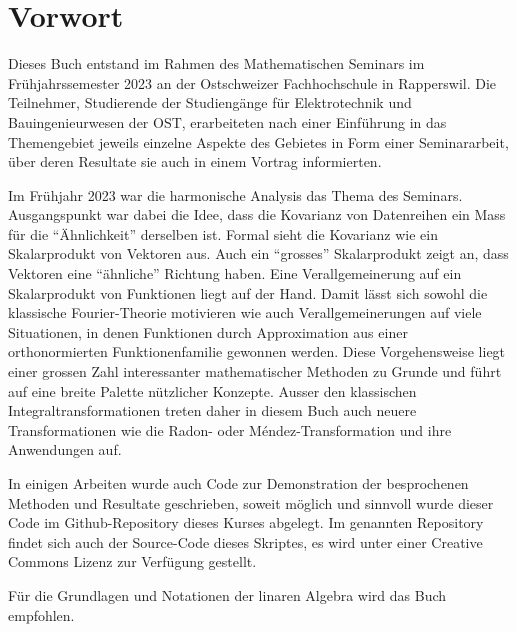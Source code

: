 %
%
%
\chapter*{Vorwort}

Dieses Buch entstand im Rahmen des Mathematischen Seminars
im Frühjahrssemester 2023 an der Ostschweizer Fachhochschule in Rapperswil.
Die Teilnehmer, Studierende der Studiengänge für Elektrotechnik
und Bauingenieurwesen
der OST, erarbeiteten nach einer Einführung in das Themengebiet jeweils
einzelne Aspekte des Gebietes in Form einer Seminararbeit, über
deren Resultate sie auch in einem Vortrag informierten. 

Im Frühjahr 2023 war die harmonische Analysis das Thema des Seminars.
Ausgangspunkt war dabei die Idee, dass die Kovarianz von Datenreihen
ein Mass für die ``Ähnlichkeit'' derselben ist.
Formal sieht die Kovarianz wie ein Skalarprodukt von Vektoren aus.
Auch ein ``grosses'' Skalarprodukt zeigt an, dass Vektoren eine
``ähnliche'' Richtung haben.
Eine Verallgemeinerung auf ein Skalarprodukt von Funktionen liegt auf der Hand.
Damit lässt sich sowohl die klassische Fourier-Theorie motivieren
wie auch Verallgemeinerungen auf viele Situationen, in denen Funktionen
durch Approximation aus einer orthonormierten Funktionenfamilie gewonnen
werden.
Diese Vorgehensweise liegt einer grossen Zahl interessanter mathematischer
Methoden zu Grunde und führt auf eine breite Palette nützlicher
Konzepte.
Ausser den klassischen Integraltransformationen treten daher in diesem
Buch auch neuere Transformationen wie die Radon- oder M\'endez-Transformation
und ihre Anwendungen auf.

In einigen Arbeiten wurde auch Code zur Demonstration der 
besprochenen Methoden und Resultate geschrieben, soweit
möglich und sinnvoll wurde dieser Code im Github-Repository
%
dieses Kurses%
\cite{buch:repo}
abgelegt.
Im genannten Repository findet sich auch der Source-Code dieses
Skriptes, es wird unter einer Creative Commons Lizenz
zur Verfügung gestellt.

Für die Grundlagen und Notationen der linaren Algebra wird das
Buch \cite{buch:linalg} empfohlen.


